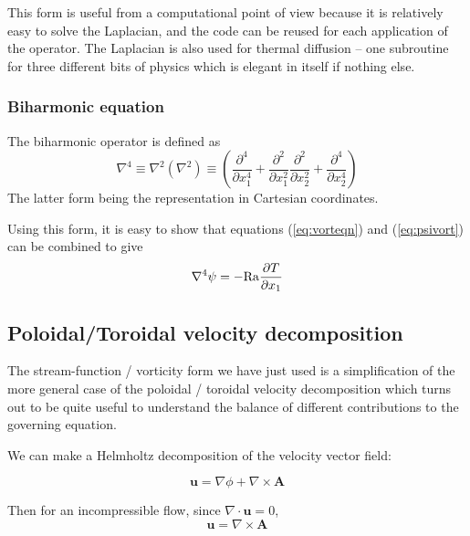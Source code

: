 \documentclass[10pt]{article}
\begin{document}
This form is useful from a computational point of view because it is
      relatively easy to solve the Laplacian, and the code can be reused for
      each application of the operator. The Laplacian is also used for
      thermal diffusion -- one subroutine for three different bits of
      physics which is elegant in itself if nothing else.
		
\subsubsection{Biharmonic equation}
		
		The biharmonic operator is defined as 
			\begin{equation}
				\nabla^4 \equiv \nabla^2 ( \nabla ^2) \equiv 
					\left( \frac{\partial ^4}{\partial x_1^4} + 
					\frac{\partial ^2}{\partial x_1^2} \frac{\partial ^2}{\partial x_2^2} +
					\frac{\partial ^4}{\partial x_2^4} \right)
			\end{equation}
		The latter form being the  representation in Cartesian coordinates.
		
		Using this form, it is easy to show that equations (\ref{eq:vorteqn}) and
		(\ref{eq:psivort}) can be combined to give 
			\begin{equation}
				\nabla^4 \psi = -{\rm Ra} \frac{\partial T}{\partial x_1}
				\label{eq:biharm}
			\end{equation}
		
		
\subsection{Poloidal/Toroidal velocity decomposition}

The stream-function / vorticity form we have just used is a simplification of the more general case
of the poloidal / toroidal velocity decomposition which turns out to be quite useful to understand 
the balance of different contributions to the governing equation.

We can make a Helmholtz decomposition of the velocity vector field:

\begin{equation}
	\mathbf{u} = \nabla \phi + \nabla \times \mathbf{A}
\end{equation}

Then for an incompressible flow, since $\nabla \cdot \mathbf{u} = 0$, 
\begin{equation}
	\mathbf{u} = \nabla \times \mathbf{A} \label{eq:curlA}
\end{equation}
		
\end{document}
